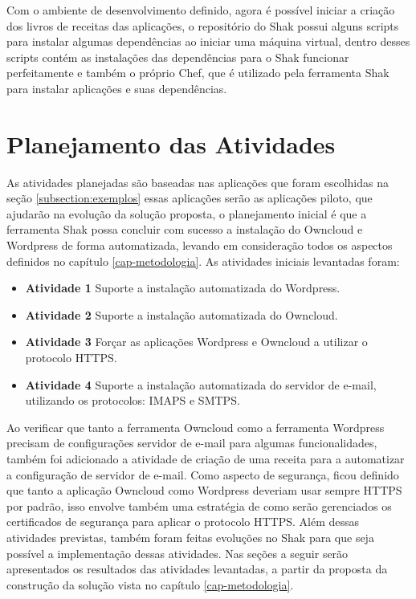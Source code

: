 Com o ambiente de desenvolvimento definido, agora é possível iniciar a criação dos
livros de receitas das aplicações, o repositório do Shak possui alguns scripts
para instalar algumas dependências ao iniciar uma máquina virtual, dentro
desses scripts contém as instalações das dependências para o Shak funcionar perfeitamente
e também o próprio Chef, que é utilizado pela ferramenta Shak para instalar aplicações
e suas dependências.


\section{Planejamento das Atividades}

As atividades planejadas são baseadas nas aplicações que foram escolhidas na seção
\ref{subsection:exemplos} essas aplicações serão as aplicações piloto, que ajudarão na evolução
da solução proposta, o planejamento inicial é que a ferramenta Shak possa concluir com sucesso
a instalação do Owncloud e Wordpress de forma automatizada,
levando em consideração todos os aspectos definidos no capítulo
\ref{cap-metodologia}. As atividades iniciais levantadas foram:

 \begin{itemize}
   \item \textbf{Atividade 1} Suporte a instalação automatizada do Wordpress.
   \item \textbf{Atividade 2} Suporte a instalação automatizada do Owncloud.
   \item \textbf{Atividade 3} Forçar as aplicações Wordpress e Owncloud a
   utilizar o protocolo HTTPS.
   \item \textbf{Atividade 4} Suporte a instalação automatizada do servidor de e-mail,
   utilizando os protocolos: IMAPS e SMTPS.
 \end{itemize}

Ao verificar que tanto a ferramenta Owncloud como a ferramenta Wordpress precisam
de configurações servidor de e-mail para algumas funcionalidades, também foi adicionado
a atividade de criação de uma receita para a automatizar a configuração de
servidor de e-mail. Como aspecto de segurança, ficou definido que tanto a aplicação
Owncloud como Wordpress deveriam usar sempre HTTPS por padrão, isso envolve também
uma estratégia de como serão gerenciados os certificados de segurança para aplicar
o protocolo HTTPS. Além dessas atividades previstas, também foram feitas evoluções
no Shak para que seja possível a implementação dessas atividades. Nas seções a
seguir serão apresentados os resultados das atividades levantadas, a partir da
proposta da construção da solução vista no capítulo \ref{cap-metodologia}.

